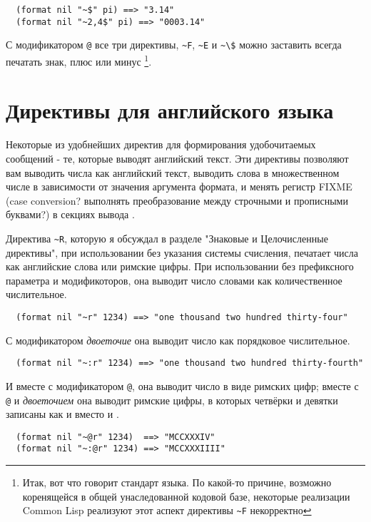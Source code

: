 {\begin{verbatim}
  (format nil "~$" pi) ==> "3.14"
  (format nil "~2,4$" pi) ==> "0003.14"
\end{verbatim}

С модификатором \lstinline!@! все три директивы, \lstinline!~F!, \lstinline!~E! и
\lstinline!~\$! можно заставить всегда печатать знак, плюс или минус \footnote{Итак, вот
  что говорит стандарт языка. По какой-то причине, возможно коренящейся в общей
  унаследованной кодовой базе, некоторые реализации Common Lisp реализуют этот аспект
  директивы \lstinline!~F! некорректно}.

\section{Директивы для английского языка}

Некоторые из удобнейших директив  для формирования удобочитаемых сообщений -
те, которые выводят английский текст. Эти директивы позволяют вам выводить числа как
английский текст, выводить слова в множественном числе в зависимости от значения аргумента
формата, и менять регистр FIXME (case conversion?  выполнять преобразование между
строчными и прописными буквами?) в секциях вывода .

Директива \lstinline!~R!, которую я обсуждал в разделе "Знаковые и Целочисленные
директивы", при использовании без указания системы счисления, печатает числа как
английские слова или римские цифры. При использовании без префиксного параметра и
модификоторов, она выводит число словами как количественное числительное.

\begin{verbatim}
  (format nil "~r" 1234) ==> "one thousand two hundred thirty-four"
\end{verbatim}

С модификатором \textit{двоеточие} она выводит число как порядковое числительное.

\begin{verbatim}
  (format nil "~:r" 1234) ==> "one thousand two hundred thirty-fourth"
\end{verbatim}

И вместе с модификатором \lstinline!@!, она выводит число в виде римских цифр; вместе с
\lstinline!@! и \textit{двоеточием} она выводит римские цифры, в которых четвёрки и
девятки записаны как  и  вместо  и .

\begin{verbatim}
  (format nil "~@r" 1234)  ==> "MCCXXXIV"
  (format nil "~:@r" 1234) ==> "MCCXXXIIII"
\end{verbatim}

}
